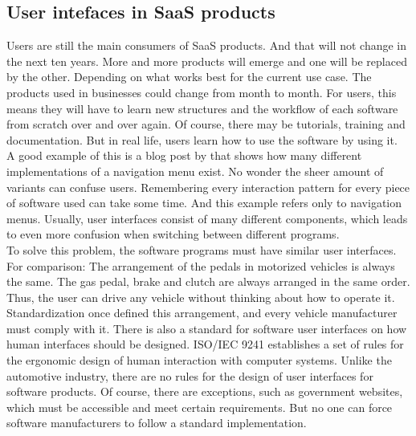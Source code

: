 \subsection{User intefaces in SaaS products}
Users are still the main consumers of SaaS products. And that will not change in the next ten years. More and more products will emerge and one will be replaced by the other. Depending on what works best for the current use case. The products used in businesses could change from month to month. For users, this means they will have to learn new structures and the workflow of each software from scratch over and over again. Of course, there may be tutorials, training and documentation. But in real life, users learn how to use the software by using it. \\
A good example of this is a blog post by \citeauthor{sernoff_website_2021} that shows how many different implementations of a navigation menu exist. No wonder the sheer amount of variants can confuse users. Remembering every interaction pattern for every piece of software used can take some time. And this example refers only to navigation menus. Usually, user interfaces consist of many different components, which leads to even more confusion when switching between different programs. \\
To solve this problem, the software programs must have similar user interfaces. For comparison: The arrangement of the pedals in motorized vehicles is always the same. The gas pedal, brake and clutch are always arranged in the same order. Thus, the user can drive any vehicle without thinking about how to operate it. Standardization once defined this arrangement, and every vehicle manufacturer must comply with it. There is also a standard for software user interfaces on how human interfaces should be designed. ISO/IEC 9241 establishes a set of rules for the ergonomic design of human interaction with computer systems. Unlike the automotive industry, there are no rules for the design of user interfaces for software products. Of course, there are exceptions, such as government websites, which must be accessible and meet certain requirements. But no one can force software manufacturers to follow a standard implementation. \\

